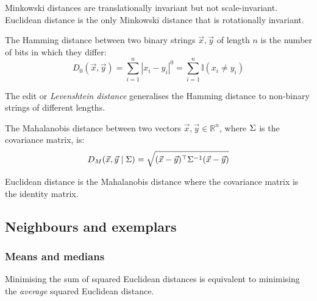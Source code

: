 Minkowski distances are translationally invariant but not scale-invariant.
Euclidean distance is the only Minkowski distance that is rotationally invariant.

\begin{dfn}
  The Hamming distance between two binary strings $\vec{x}, \vec{y}$ of length
  $n$ is the number of bits in which they differ:
  \begin{equation}
    D_{0}(\vec{x}, \vec{y})
    = \sum_{i = 1}^{n} |x_i - y_i|^{0}
    = \sum_{i = 1}^{n} \mathbb{I}(x_i \neq y_i)
  \end{equation}
\end{dfn}

The edit or \textit{Levenshtein distance} generalises the Hamming distance to
non-binary strings of different lengths.

\begin{dfn}
  The Mahalanobis distance between two vectors $\vec{x}, \vec{y} \in \mathbb{R}^n$,
  where $\Sigma$ is the covariance matrix, is:
  \begin{equation}
    D_{M}(\vec{x}, \vec{y} \mid \Sigma)
    = \sqrt{ (\vec{x} - \vec{y})^{\top} \Sigma^{-1} (\vec{x} - \vec{y}) }
  \end{equation}
\end{dfn}

Euclidean distance is the Mahalanobis distance where the covariance matrix is
the identity matrix.

\subsection{Neighbours and exemplars}

\subsubsection{Means and medians}

Minimising the sum of squared Euclidean distances is equivalent to minimising
the \textit{average} squared Euclidean distance.

